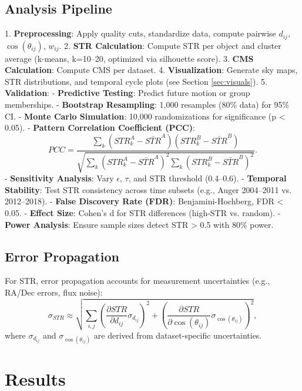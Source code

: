 \documentclass[12pt, twocolumn]{article}
\begin{document}
\subsection{Analysis Pipeline}
1. \textbf{Preprocessing}: Apply quality cuts, standardize data, compute pairwise \(d_{ij}\), \(\cos(\theta_{ij})\), \(w_{ij}\).
2. \textbf{STR Calculation}: Compute STR per object and cluster average (k-means, k=10–20, optimized via silhouette score).
3. \textbf{CMS Calculation}: Compute CMS per dataset.
4. \textbf{Visualization}: Generate sky maps, STR distributions, and temporal cycle plots (see Section \ref{sec:visuals}).
5. \textbf{Validation}:
   - \textbf{Predictive Testing}: Predict future motion or group memberships.
   - \textbf{Bootstrap Resampling}: 1,000 resamples (80\% data) for 95\% CI.
   - \textbf{Monte Carlo Simulation}: 10,000 randomizations for significance (p < 0.05).
   - \textbf{Pattern Correlation Coefficient (PCC)}:
     \begin{equation}
         PCC = \frac{\sum_k (STR_k^A - \bar{STR}^A)(STR_k^B - \bar{STR}^B)}{\sqrt{\sum_k (STR_k^A - \bar{STR}^A)^2 \sum_k (STR_k^B - \bar{STR}^B)^2}}.
         \label{eq:pcc}
     \end{equation}
   - \textbf{Sensitivity Analysis}: Vary \(\epsilon\), \(\tau\), and STR threshold (0.4–0.6).
   - \textbf{Temporal Stability}: Test STR consistency across time subsets (e.g., Auger 2004–2011 vs. 2012–2018).
   - \textbf{False Discovery Rate (FDR)}: Benjamini-Hochberg, FDR < 0.05.
   - \textbf{Effect Size}: Cohen’s d for STR differences (high-STR vs. random).
   - \textbf{Power Analysis}: Ensure sample sizes detect STR > 0.5 with 80\% power.

\subsection{Error Propagation}
For STR, error propagation accounts for measurement uncertainties (e.g., RA/Dec errors, flux noise):
\begin{equation}
    \sigma_{STR} \approx \sqrt{\sum_{i,j} \left( \frac{\partial STR}{\partial d_{ij}} \sigma_{d_{ij}} \right)^2 + \left( \frac{\partial STR}{\partial \cos(\theta_{ij})} \sigma_{\cos(\theta_{ij})} \right)^2},
\end{equation}
where \(\sigma_{d_{ij}}\) and \(\sigma_{\cos(\theta_{ij})}\) are derived from dataset-specific uncertainties.

\section{Results}
\label{sec:results}
\end{document}
